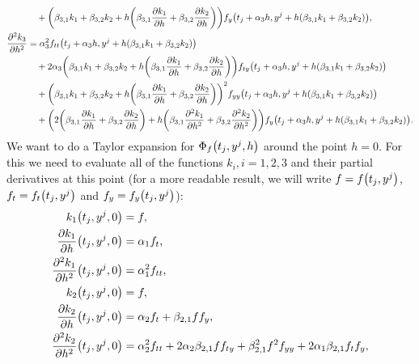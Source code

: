\documentclass{exercise}
\begin{document}
\begin{enumerate}
\begin{align*}
			&\quad + \parentheses*{\beta_{3, 1}k_1 + \beta_{3, 2}k_2 + h\parentheses*{\beta_{3, 1}\frac{\partial k_1}{\partial h} + \beta_{3, 2}\frac{\partial k_2}{\partial h}}}f_y\parentheses*{t_j + \alpha_3 h, y^j + h\parentheses*{\beta_{3, 1}k_1 + \beta_{3, 2}k_2}},\\
			\frac{\partial^2 k_3}{\partial h^2} &= \alpha_3^2 f_{tt}\parentheses*{t_j + \alpha_3 h, y^j + h\parentheses*{\beta_{3, 1}k_1 + \beta_{3, 2}k_2}}\\
			&\quad + 2\alpha_3\parentheses*{\beta_{3, 1}k_1 + \beta_{3, 2}k_2 + h\parentheses*{\beta_{3, 1}\frac{\partial k_1}{\partial h} + \beta_{3, 2}\frac{\partial k_2}{\partial h}}}f_{ty}\parentheses*{t_j + \alpha_3 h, y^j + h\parentheses*{\beta_{3, 1}k_1 + \beta_{3, 2}k_2}}\\
			&\quad + \parentheses*{\beta_{3, 1}k_1 + \beta_{3, 2}k_2 + h\parentheses*{\beta_{3, 1}\frac{\partial k_1}{\partial h} + \beta_{3, 2}\frac{\partial k_2}{\partial h}}}^2 f_{yy}\parentheses*{t_j + \alpha_3 h, y^j + h\parentheses*{\beta_{3, 1}k_1 + \beta_{3, 2}k_2}}\\
			&\quad + \parentheses*{2\parentheses*{\beta_{3, 1}\frac{\partial k_1}{\partial h} + \beta_{3, 2}\frac{\partial k_2}{\partial h}} + h\parentheses*{\beta_{3, 1}\frac{\partial^2 k_1}{\partial h^2} + \beta_{3, 2}\frac{\partial^2 k_2}{\partial h^2}}}f_y\parentheses*{t_j + \alpha_3 h, y^j + h\parentheses*{\beta_{3, 1}k_1 + \beta_{3, 2}k_2}}.
		\end{align*}
		We want to do a Taylor expansion for \(\Phi_f\parentheses*{t_j, y^j, h}\) around the point \(h = 0\).
		For this we need to evaluate all of the functions \(k_i, i = 1, 2, 3\) and their partial derivatives at this point (for a more readable result, we will write \(f = f\parentheses*{t_j, y^j}\), \(f_t = f_t\parentheses*{t_j, y^j}\) and \(f_y = f_y\parentheses*{t_j, y^j}\)):
		\begin{align*}
			k_1\parentheses*{t_j, y^j, 0} &= f,\\
			\frac{\partial k_1}{\partial h}\parentheses*{t_j, y^j, 0} &= \alpha_1 f_t,\\
			\frac{\partial^2 k_1}{\partial h^2}\parentheses*{t_j, y^j, 0} &= \alpha_1^2 f_{tt},\\
			k_2\parentheses*{t_j, y^j, 0} &= f,\\
			\frac{\partial k_2}{\partial h}\parentheses*{t_j, y^j, 0} &= \alpha_2 f_t + \beta_{2, 1}ff_y,\\
			\frac{\partial^2 k_2}{\partial h^2}\parentheses*{t_j, y^j, 0} &= \alpha_2^2 f_{tt} + 2\alpha_2 \beta_{2, 1} ff_{ty} + \beta_{2, 1}^2 f^2 f_{yy} + 2\alpha_1 \beta_{2, 1}f_t f_y,\\

\end{align*}
\end{enumerate}
\end{document}
